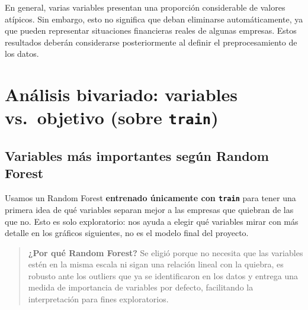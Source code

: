 \documentclass[
]{book}
\begin{document}
En general, varias variables presentan una proporción considerable de valores
atípicos. Sin embargo, esto no significa que deban eliminarse automáticamente, ya que
pueden representar situaciones financieras reales de algunas empresas. Estos
resultados deberán considerarse posteriormente al definir el preprocesamiento de los
datos.

\chapter{\texorpdfstring{Análisis bivariado: variables vs.~objetivo (sobre \texttt{train})}{Análisis bivariado: variables vs.~objetivo (sobre train)}}\label{anuxe1lisis-bivariado-variables-vs.-objetivo-sobre-train}

\section{Variables más importantes según Random Forest}\label{variables-muxe1s-importantes-seguxfan-random-forest}

Usamos un Random Forest \textbf{entrenado únicamente con \texttt{train}} para tener una primera
idea de qué variables separan mejor a las empresas que quiebran de las que no. Esto es
solo exploratorio: nos ayuda a elegir qué variables mirar con más detalle en los
gráficos siguientes, no es el modelo final del proyecto.

\begin{quote}
\textbf{¿Por qué Random Forest?} Se eligió porque no necesita que las variables estén en
la misma escala ni sigan una relación lineal con la quiebra, es robusto ante los
outliers que ya se identificaron en los datos y entrega una medida de importancia de
variables por defecto, facilitando la interpretación para fines exploratorios.
\end{quote}
\end{document}
